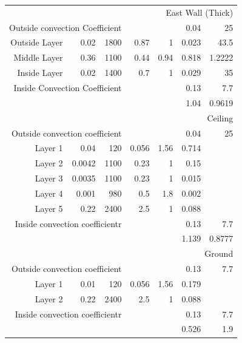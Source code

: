\documentclass[a4paper, oneside]{discothesis}
\begin{document}
\begin{table}[h!]
\begin{tabular}{rrrrrrr}
			    \midrule
			    \multicolumn{7}{p{26.86em}}{East Wall (Thick)} \\
			    \multicolumn{3}{p{13.93em}}{Outside convection Coefficient} &      &      & 0.04 & 25 \\
			    \multicolumn{1}{p{6.785em}}{Outside Layer} & 0.02 & 1800 & 0.87 & 1    & 0.023 & 43.5 \\
			    \multicolumn{1}{p{6.785em}}{Middle Layer} & 0.36 & 1100 & 0.44 & 0.94 & 0.818 & 1.2222 \\
			    \multicolumn{1}{p{6.785em}}{Inside Layer} & 0.02 & 1400 & 0.7  & 1    & 0.029 & 35 \\
			    \multicolumn{3}{p{13.93em}}{Inside Convection Coefficient} &      &      & 0.13 & 7.7 \\
			         &      &      &      &      & 1.04 & 0.9619 \\
			    \midrule
			    \multicolumn{7}{p{26.86em}}{Ceiling} \\
			    \multicolumn{3}{p{13.93em}}{Outside convection coefficient} &      &      & 0.04 & 25 \\
			    \multicolumn{1}{p{6.785em}}{Layer 1} & 0.04 & 120  & 0.056 & 1.56 & 0.714 &  \\
			    \multicolumn{1}{p{6.785em}}{Layer 2} & 0.0042 & 1100 & 0.23 & 1    & 0.15 &  \\
			    \multicolumn{1}{p{6.785em}}{Layer 3} & 0.0035 & 1100 & 0.23 & 1    & 0.015 &  \\
			    \multicolumn{1}{p{6.785em}}{Layer 4} & 0.001 & 980  & 0.5  & 1.8  & 0.002 &  \\
			    \multicolumn{1}{p{6.785em}}{Layer 5} & 0.22 & 2400 & 2.5  & 1    & 0.088 &  \\
			    \multicolumn{3}{p{13.93em}}{Inside convection coefficientr} &      &      & 0.13 & 7.7 \\
			         &      &      &      &      & 1.139 & 0.8777 \\
			    \midrule
			    \multicolumn{7}{p{26.86em}}{Ground} \\
			    \multicolumn{3}{p{13.93em}}{Outside convection coefficient} &      &      & 0.13 & 7.7 \\
			    \multicolumn{1}{p{6.785em}}{Layer 1} & 0.01 & 120  & 0.056 & 1.56 & 0.179 &  \\
			    \multicolumn{1}{p{6.785em}}{Layer 2} & 0.22 & 2400 & 2.5  & 1    & 0.088 &  \\
			    \multicolumn{3}{p{13.93em}}{Inside convection coefficientr} &      &      & 0.13 & 7.7 \\
			         &      &      &      &      & 0.526 & 1.9 \\
			    \bottomrule
			    \end{tabular}%
			  \label{tab:SumatraWallMaterial}%
			\end{table}%
\end{document}
